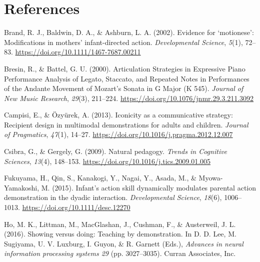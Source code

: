 \documentclass[
  english,
  man,floatsintext]{apa6}
\newlength{\cslhangindent}
\newenvironment{CSLReferences}[2] %
 {%
  \setlength{\parindent}{0pt}
  \ifodd #1 \everypar{\setlength{\hangindent}{\cslhangindent}}\ignorespaces\fi
  \ifnum #2 > 0
  \setlength{\parskip}{#2\baselineskip}
  \fi
 }%
 {}
\begin{document}
\hypertarget{references}{%
\section{References}\label{references}}

\begingroup
\setlength{\parindent}{-0in}
\setlength{\leftskip}{0in}

\hypertarget{refs}{}
\begin{CSLReferences}{1}{0}
\leavevmode{}%
Brand, R. J., Baldwin, D. A., \& Ashburn, L. A. (2002). Evidence for {`motionese'}: Modifications in mothers' infant-directed action. \emph{Developmental Science}, \emph{5}(1), 72--83. \url{https://doi.org/10.1111/1467-7687.00211}

\leavevmode{}%
Bresin, R., \& Battel, G. U. (2000). Articulation {Strategies} in {Expressive Piano Performance Analysis} of {Legato}, {Staccato}, and {Repeated Notes} in {Performances} of the {Andante Movement} of {Mozart}'s {Sonata} in {G Major} ({K} 545). \emph{Journal of New Music Research}, \emph{29}(3), 211--224. \url{https://doi.org/10.1076/jnmr.29.3.211.3092}

\leavevmode{}%
Campisi, E., \& Özyürek, A. (2013). Iconicity as a communicative strategy: {Recipient} design in multimodal demonstrations for adults and children. \emph{Journal of Pragmatics}, \emph{47}(1), 14--27. \url{https://doi.org/10.1016/j.pragma.2012.12.007}

\leavevmode{}%
Csibra, G., \& Gergely, G. (2009). Natural pedagogy. \emph{Trends in Cognitive Sciences}, \emph{13}(4), 148--153. \url{https://doi.org/10.1016/j.tics.2009.01.005}

\leavevmode{}%
Fukuyama, H., Qin, S., Kanakogi, Y., Nagai, Y., Asada, M., \& Myowa-Yamakoshi, M. (2015). Infant's action skill dynamically modulates parental action demonstration in the dyadic interaction. \emph{Developmental Science}, \emph{18}(6), 1006--1013. \url{https://doi.org/10.1111/desc.12270}

\leavevmode{}%
Ho, M. K., Littman, M., MacGlashan, J., Cushman, F., \& Austerweil, J. L. (2016). Showing versus doing: {Teaching} by demonstration. In D. D. Lee, M. Sugiyama, U. V. Luxburg, I. Guyon, \& R. Garnett (Eds.), \emph{Advances in neural information processing systems 29} (pp. 3027--3035). {Curran Associates, Inc.}


\end{CSLReferences}
\end{document}
